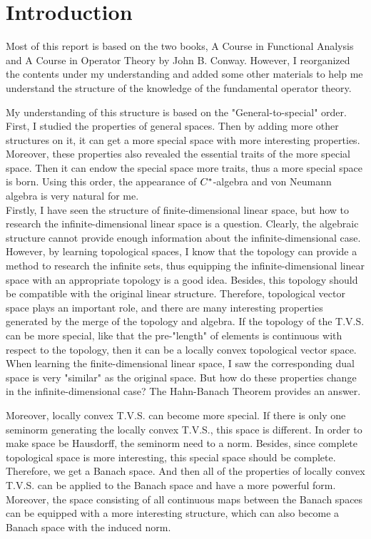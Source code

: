 \chapter{Introduction}

Most of this report is based on the two books, A Course in Functional Analysis and A Course in Operator Theory by John B. Conway. However, I reorganized the contents under my understanding and added some other materials to help me understand the structure of the knowledge of the fundamental operator theory.

My understanding of this structure is based on the "General-to-special" order. First, I studied the properties of general spaces. Then by adding more other structures on it, it can get a more special space with more interesting properties. Moreover, these properties also revealed the essential traits of the more special space. Then it can endow the special space more traits, thus a more special space is born. Using this order, the appearance of $C^{*}$-algebra and von Neumann algebra is very natural for me.\\
Firstly, I have seen the structure of finite-dimensional linear space, but how to research the infinite-dimensional linear space is a question. Clearly, the algebraic structure cannot provide enough information about the infinite-dimensional case. However, by learning topological spaces, I know that the topology can provide a method to research the infinite sets, thus equipping the infinite-dimensional linear space with an appropriate topology is a good idea. Besides, this topology should be compatible with the original linear structure. Therefore, topological vector space plays an important role, and there are many interesting properties generated by the merge of the topology and algebra. If the topology of the T.V.S. can be more special, like that the pre-"length" of elements is continuous with respect to the topology, then it can be a locally convex topological vector space. When learning the finite-dimensional linear space, I saw the corresponding dual space is very "similar" as the original space. But how do these properties change in the infinite-dimensional case? The Hahn-Banach Theorem provides an answer.

Moreover, locally convex T.V.S. can become more special. If there is only one seminorm generating the locally convex T.V.S., this space is different. In order to make space be Hausdorff, the seminorm need to a norm. Besides, since complete topological space is more interesting, this special space should be complete. Therefore, we get a Banach space. And then all of the properties of locally convex T.V.S. can be applied to the Banach space and have a more powerful form. Moreover, the space consisting of all continuous maps between the Banach spaces can be equipped with a more interesting structure, which can also become a Banach space with the induced norm.

